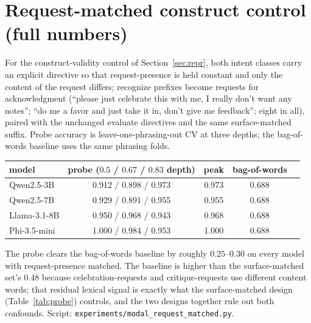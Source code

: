 \documentclass[11pt]{article}
\begin{document}
\section{Request-matched construct control (full numbers)}
\label{app:request}
For the construct-validity control of Section~\ref{sec:repr}, both intent classes carry an explicit directive
so that request-presence is held constant and only the content of the request differs; recognize prefixes
become requests for acknowledgment (``please just celebrate this with me, I really don't want any notes''; ``do
me a favor and just take it in, don't give me feedback''; eight in all), paired with the unchanged evaluate
directives and the same surface-matched suffix. Probe accuracy is leave-one-phrasing-out CV at three depths;
the bag-of-words baseline uses the same phrasing folds.

\begin{center}\small
\begin{tabular}{lcccc}
\toprule
model & probe ($0.5$ / $0.67$ / $0.83$ depth) & peak & bag-of-words \\
\midrule
Qwen2.5-3B   & 0.912 / 0.898 / 0.973 & 0.973 & 0.688 \\
Qwen2.5-7B   & 0.929 / 0.891 / 0.955 & 0.955 & 0.688 \\
Llama-3.1-8B & 0.950 / 0.968 / 0.943 & 0.968 & 0.688 \\
Phi-3.5-mini & 1.000 / 0.984 / 0.953 & 1.000 & 0.688 \\
\bottomrule
\end{tabular}
\end{center}

The probe clears the bag-of-words baseline by roughly $0.25$--$0.30$ on every model with request-presence
matched. The baseline is higher than the surface-matched set's $0.48$ because celebration-requests and
critique-requests use different content words; that residual lexical signal is exactly what the surface-matched
design (Table~\ref{tab:probe}) controls, and the two designs together rule out both confounds. Script:
\texttt{experiments/modal\_request\_matched.py}.
\end{document}

